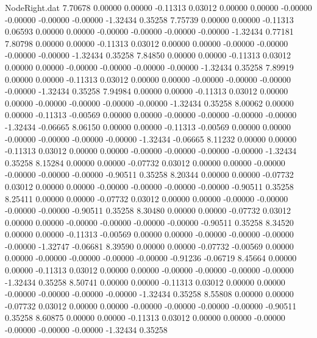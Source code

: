 \begin{filecontents}{NodeRight.dat}
   7.70678    0.00000    0.00000    -0.11313    0.03012    0.00000    0.00000   -0.00000   -0.00000   -0.00000   -0.00000   -1.32434    0.35258
   7.75739    0.00000    0.00000    -0.11313    0.06593    0.00000    0.00000   -0.00000   -0.00000   -0.00000   -0.00000   -1.32434    0.77181
   7.80798    0.00000    0.00000    -0.11313    0.03012    0.00000    0.00000   -0.00000   -0.00000   -0.00000   -0.00000   -1.32434    0.35258
   7.84850    0.00000    0.00000    -0.11313    0.03012    0.00000    0.00000   -0.00000   -0.00000   -0.00000   -0.00000   -1.32434    0.35258
   7.89919    0.00000    0.00000    -0.11313    0.03012    0.00000    0.00000   -0.00000   -0.00000   -0.00000   -0.00000   -1.32434    0.35258
   7.94984    0.00000    0.00000    -0.11313    0.03012    0.00000    0.00000   -0.00000   -0.00000   -0.00000   -0.00000   -1.32434    0.35258
   8.00062    0.00000    0.00000    -0.11313   -0.00569    0.00000    0.00000   -0.00000   -0.00000   -0.00000   -0.00000   -1.32434   -0.06665
   8.06150    0.00000    0.00000    -0.11313   -0.00569    0.00000    0.00000   -0.00000   -0.00000   -0.00000   -0.00000   -1.32434   -0.06665
   8.11232    0.00000    0.00000    -0.11313    0.03012    0.00000    0.00000   -0.00000   -0.00000   -0.00000   -0.00000   -1.32434    0.35258
   8.15284    0.00000    0.00000    -0.07732    0.03012    0.00000    0.00000   -0.00000   -0.00000   -0.00000   -0.00000   -0.90511    0.35258
   8.20344    0.00000    0.00000    -0.07732    0.03012    0.00000    0.00000   -0.00000   -0.00000   -0.00000   -0.00000   -0.90511    0.35258
   8.25411    0.00000    0.00000    -0.07732    0.03012    0.00000    0.00000   -0.00000   -0.00000   -0.00000   -0.00000   -0.90511    0.35258
   8.30480    0.00000    0.00000    -0.07732    0.03012    0.00000    0.00000   -0.00000   -0.00000   -0.00000   -0.00000   -0.90511    0.35258
   8.34520    0.00000    0.00000    -0.11313   -0.00569    0.00000    0.00000   -0.00000   -0.00000   -0.00000   -0.00000   -1.32747   -0.06681
   8.39590    0.00000    0.00000    -0.07732   -0.00569    0.00000    0.00000   -0.00000   -0.00000   -0.00000   -0.00000   -0.91236   -0.06719
   8.45664    0.00000    0.00000    -0.11313    0.03012    0.00000    0.00000   -0.00000   -0.00000   -0.00000   -0.00000   -1.32434    0.35258
   8.50741    0.00000    0.00000    -0.11313    0.03012    0.00000    0.00000   -0.00000   -0.00000   -0.00000   -0.00000   -1.32434    0.35258
   8.55808    0.00000    0.00000    -0.07732    0.03012    0.00000    0.00000   -0.00000   -0.00000   -0.00000   -0.00000   -0.90511    0.35258
   8.60875    0.00000    0.00000    -0.11313    0.03012    0.00000    0.00000   -0.00000   -0.00000   -0.00000   -0.00000   -1.32434    0.35258

\end{filecontents}
